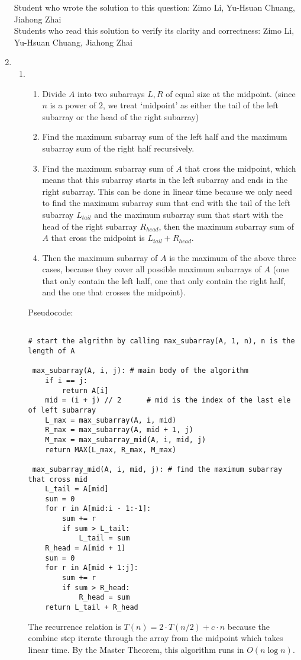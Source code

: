 \documentclass{article}
\begin{document}
\begin{enumerate}
    \newpage
    Student who wrote the solution to this question: Zimo Li, Yu-Hsuan Chuang, Jiahong Zhai\\
    Students who read this solution to verify its clarity and correctness: Zimo Li, Yu-Hsuan Chuang, Jiahong Zhai\\
    \item
    \begin{enumerate}
        \item 
        \begin{enumerate}
            \item Divide $A$ into two subarrays $L, R$ of equal size at the midpoint. (since $n$ is a power of $2$, we treat `midpoint' as either the tail of the left subarray or the head of the right subarray)
            \item Find the maximum subarray sum of the left half and the maximum subarray sum of the right half recursively.
            \item Find the maximum subarray sum of $A$ that cross the midpoint, which means that this subarray starts in the left subarray and ends in the right subarray. This can be done in linear time because we only need to find the maximum subarray sum that end with the tail of the left subarray $L_{tail}$ and the maximum subarray sum that start with the head of the right subarray $R_{head}$, then the maximum subarray sum of $A$ that cross the midpoint is $L_{tail}+R_{head}$.
            \item Then the maximum subarray of $A$ is the maximum of the above three cases, because they cover all possible maximum subarrays of $A$ (one that only contain the left half, one that only contain the right half, and the one that crosses the midpoint).
        \end{enumerate}

        Pseudocode:
        \begin{verbatim}

# start the algrithm by calling max_subarray(A, 1, n), n is the length of A

 max_subarray(A, i, j): # main body of the algorithm
    if i == j:
        return A[i]
    mid = (i + j) // 2      # mid is the index of the last ele of left subarray
    L_max = max_subarray(A, i, mid)
    R_max = max_subarray(A, mid + 1, j)
    M_max = max_subarray_mid(A, i, mid, j)
    return MAX(L_max, R_max, M_max)

 max_subarray_mid(A, i, mid, j): # find the maximum subarray that cross mid
    L_tail = A[mid]
    sum = 0
    for r in A[mid:i - 1:-1]:
        sum += r
        if sum > L_tail:
            L_tail = sum
    R_head = A[mid + 1]
    sum = 0
    for r in A[mid + 1:j]:
        sum += r
        if sum > R_head:
            R_head = sum
    return L_tail + R_head
        \end{verbatim}
        The recurrence relation is $T(n) = 2\cdot T(n/2) + c\cdot n$ because the combine step iterate through the array from the midpoint which takes linear time. By the Master Theorem, this algorithm runs in $O(n\log n)$.
        

\end{enumerate}
\end{enumerate}
\end{document}
